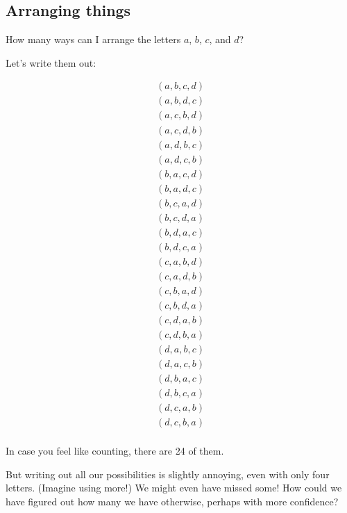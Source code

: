 


\subsection{Arranging things}


How many ways can I arrange the letters $a$, $b$, $c$, and $d$?

Let's write them out:

\begin{gather*}
(a, b, c, d) \\
(a, b, d, c) \\
(a, c, b, d) \\
(a, c, d, b) \\
(a, d, b, c) \\
(a, d, c, b) \\
(b, a, c, d) \\
(b, a, d, c) \\
(b, c, a, d) \\
(b, c, d, a) \\
(b, d, a, c) \\
(b, d, c, a) \\
(c, a, b, d) \\
(c, a, d, b) \\
(c, b, a, d) \\
(c, b, d, a) \\
(c, d, a, b) \\
(c, d, b, a) \\
(d, a, b, c) \\
(d, a, c, b) \\
(d, b, a, c) \\
(d, b, c, a) \\
(d, c, a, b) \\
(d, c, b, a) \\
\end{gather*}

In case you feel like counting, there are 24 of them.

But writing out all our possibilities is slightly annoying, even with only four letters. (Imagine using more!) We might even have missed some! How could we have figured out how many we have otherwise, perhaps with more confidence? %

